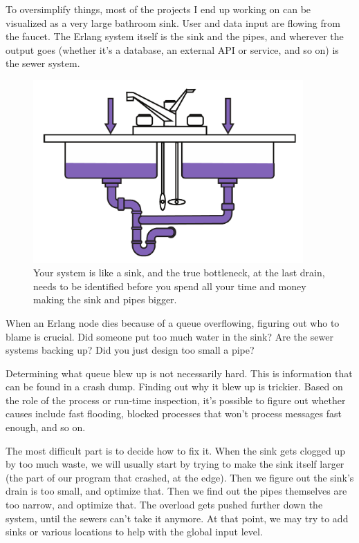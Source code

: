 \documentclass[11pt, oneside]{book}   	%
\begin{document}
To oversimplify things, most of the projects I end up working on can be visualized as a very large bathroom sink. User and data input are flowing from the faucet. The Erlang system itself is the sink and the pipes, and wherever the output goes (whether it's a database, an external API or service, and so on) is the sewer system.

\begin{figure}
  \includegraphics[max height=7cm]{sink.pdf}%
  \centering%
  \caption{Your system is like a sink, and the true bottleneck, at the last drain, needs to be identified before you spend all your time and money making the sink and pipes bigger.}%
   \label{fig:tracing-venn}
\end{figure}

When an Erlang node dies because of a queue overflowing, figuring out who to blame is crucial. Did someone put too much water in the sink? Are the sewer systems backing up? Did you just design too small a pipe?

Determining what queue blew up is not necessarily hard. This is information that can be found in a crash dump. Finding out why it blew up is trickier. Based on the role of the process or run-time inspection, it's possible to figure out whether causes include fast flooding, blocked processes that won't process messages fast enough, and so on.

The most difficult part is to decide how to fix it. When the sink gets clogged up by too much waste, we will usually start by trying to make the sink itself larger (the part of our program that crashed, at the edge). Then we figure out the sink's drain is too small, and optimize that. Then we find out the pipes themselves are too narrow, and optimize that. The overload gets pushed further down the system, until the sewers can't take it anymore. At that point, we may try to add sinks or various locations to help with the global input level.
\end{document}
